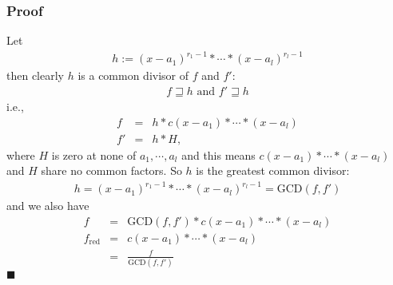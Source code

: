 \documentclass[11pt]{book}
\begin{document}
\subsubsection{Proof}
Let 
\begin{eqnarray}
h := (x -a_1)^{r_1-1} *\cdots * (x-a_l)^{r_l-1}
\end{eqnarray}
then clearly $h$ is a common divisor of $f$ and $f'$:
\begin{eqnarray}
f \sqsupseteq h \text{ and } f' \sqsupseteq h
\end{eqnarray}
i.e.,
\begin{eqnarray}
f &=& h * c (x -a_1) * \cdots * (x-a_l) \\
f' &=& h * H,
\end{eqnarray}
where $H$ is zero at none of $a_1, \cdots, a_l$ and this means $c (x -a_1) * \cdots * (x-a_l)$ and $H$ share no common factors.
So $h$ is the greatest common divisor:
\begin{eqnarray}
h = (x -a_1)^{r_1-1} *\cdots * (x-a_l)^{r_l-1} = \text{GCD}(f,f') 
\end{eqnarray}
and we also have
\begin{eqnarray}
f &=& \text{GCD}(f,f')  * c (x -a_1) * \cdots * (x-a_l) \\
f_\text{red} &=& c (x -a_1) * \cdots * (x-a_l) \\
&=& \frac{f}{\text{GCD}(f,f')}
\end{eqnarray}
$\blacksquare$
\end{document}
